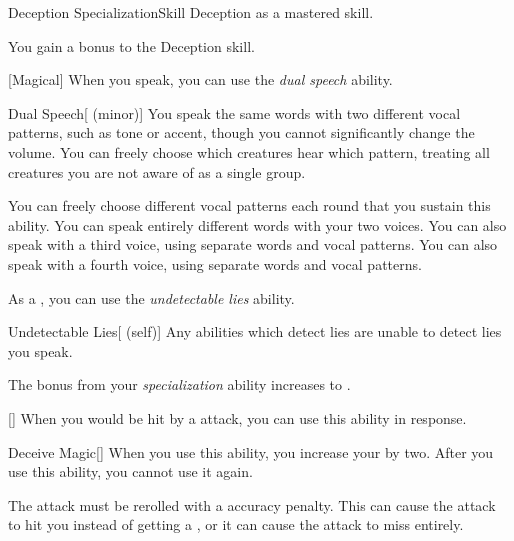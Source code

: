    \begin{feat}{Deception Specialization}{Skill}
        \featpre Deception as a mastered skill.

         You gain a  bonus to the Deception skill.

        [Magical] When you speak, you can use the \textit{dual speech} ability.
        \begin{freeability}{Dual Speech}[ (minor)]
            You speak the same words with two different vocal patterns, such as tone or accent, though you cannot significantly change the volume.
            You can freely choose which creatures hear which pattern, treating all creatures you are not aware of as a single group. 

            You can freely choose different vocal patterns each round that you sustain this ability.
            \rankline
             You can speak entirely different words with your two voices.
             You can also speak with a third voice, using separate words and vocal patterns.
             You can also speak with a fourth voice, using separate words and vocal patterns.
        \end{freeability}

         As a , you can use the \textit{undetectable lies} ability.
        \begin{attuneability}{Undetectable Lies}[ (self)]
            Any  abilities which detect lies are unable to detect lies you speak.
        \end{attuneability}

         The bonus from your \textit{specialization} ability increases to .

        [] When you would be hit by a  attack, you can use this ability in response.
        \begin{freeability}{Deceive Magic}[]
            When you use this ability, you increase your  by two.
            After you use this ability, you  cannot use it again.

            The attack must be rerolled with a  accuracy penalty.
            This can cause the attack to hit you instead of getting a , or it can cause the attack to miss entirely.
        \end{freeability}


\end{feat}
